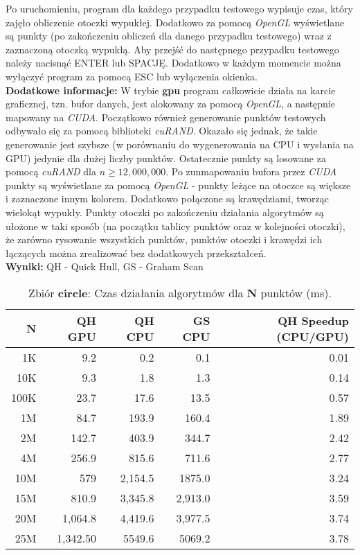 \documentclass[11pt]{article}
\begin{document}
    Po uruchomieniu, program dla każdego przypadku testowego wypisuje czas, który zajęło obliczenie otoczki wypukłej. Dodatkowo za pomocą \textit{OpenGL} wyświetlane są punkty (po zakończeniu obliczeń dla danego przypadku testowego) wraz z zaznaczoną otoczką wypukłą. Aby przejść do następnego przypadku testowego należy nacisnąć ENTER lub SPACJĘ. Dodatkowo w każdym momencie można wyłączyć program za pomocą ESC lub wyłączenia okienka. \\
    
    \textbf{Dodatkowe informacje:} W trybie \textbf{gpu} program całkowicie działa na karcie graficznej, tzn. bufor danych, jest alokowany za pomocą \textit{OpenGL}, a następnie mapowany na \textit{CUDA}. Początkowo również generowanie punktów testowych odbywało się za pomocą biblioteki \textit{cuRAND}. Okazało się jednak, że takie generowanie jest szybsze (w porównaniu do wygenerowania na CPU i wysłania na GPU) jedynie dla dużej liczby punktów. Ostatecznie punkty są losowane za pomocą \textit{cuRAND} dla $n \geq 12,000,000$. Po zunmapowaniu bufora przez \textit{CUDA} punkty są wyświetlane za pomocą \textit{OpenGL} - punkty leżące na otoczce są większe i zaznaczone innym kolorem. Dodatkowo połączone są krawędziami, tworząc wielokąt wypukły. Punkty otoczki po zakończeniu działania algorytmów są ułożone w taki sposób (na początku tablicy punktów oraz w kolejności otoczki), że zarówno rysowanie wszystkich punktów, punktów otoczki i krawędzi ich łączących można zrealizować bez dodatkowych przekształceń. \\
    
    \textbf{Wyniki:}
    QH - Quick Hull, GS - Graham Scan
    \begin{table}[H]
        \centering
        \begin{tabular}{r|r|r|r|r}
\textbf{N} & \textbf{QH GPU} & \textbf{QH CPU} & \textbf{GS CPU} & \textbf{QH Speedup (CPU/GPU)} \\ \hline
1K & 9.2 & 0.2 & 0.1 & 0.01 \\ \hline
10K & 9.3 & 1.8 & 1.3 & 0.14 \\ \hline
100K & 23.7 & 17.6 & 13.5 & 0.57 \\ \hline
1M & 84.7 & 193.9 & 160.4 & 1.89 \\ \hline
2M & 142.7 & 403.9 & 344.7 & 2.42 \\ \hline
4M & 256.9 & 815.6 & 711.6 & 2.77 \\ \hline
10M & 579 & 2,154.5 & 1875.0 & 3.24 \\ \hline
15M & 810.9 & 3,345.8 & 2,913.0 & 3.59 \\ \hline
20M & 1,064.8 & 4,419.6 & 3,977.5 & 3.74 \\ \hline
25M & 1,342.50 & 5549.6 & 5069.2 & 3.78
        \end{tabular}
        \caption{Zbiór \textbf{circle}: Czas działania algorytmów dla \textbf{N} punktów (ms).}
    \end{table}
    
\end{document}
